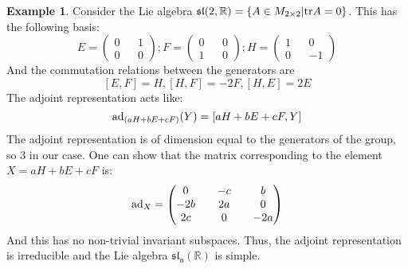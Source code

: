 \documentclass[12pt,a4paper]{report}
\theoremstyle{definition}
\theoremstyle{Theorem}
\theoremstyle{definition}
\newtheorem{Ex}[Def]{Example}
\theoremstyle{definition}
\begin{document}
	\begin{Ex}
		Consider the Lie algebra $\mathfrak{sl}(2,\mathbb{R})=\{A\in M_{2\times 2}|\hbox{tr} A=0\}$. This has the following basis:
		$$E=
		\begin{pmatrix}
			0 && 1\\
			0 && 0
		\end{pmatrix};
		F=
		\begin{pmatrix}
			0 && 0\\
			1 && 0
		\end{pmatrix};
		H=
		\begin{pmatrix}
			1 && 0\\
			0 && -1
		\end{pmatrix}$$
		And the commutation relations between the generators are 
		$$[E,F]=H, [H,F]=-2F,[H,E]=2E$$
		The adjoint representation acts like:
		$$\hbox{ad}_{(aH+bE+cF)}(Y)=[aH+bE+cF,Y]$$
		The adjoint representation is of dimension equal to the generators of the group, so 3 in our case. One can show that the matrix corresponding to the element $X=aH+bE+cF$ is:
		$$\hbox{ad}_X=
		\begin{pmatrix}
			0 && -c && b \\
			-2b && 2a && 0 \\
			2c && 0 && -2a \\
		\end{pmatrix}$$
		And this has no non-trivial invariant subspaces. Thus, the adjoint representation is irreducible and the Lie algebra $\mathfrak{sl_n}(\mathbb{R})$ is simple.
	\end{Ex}
\end{document}
